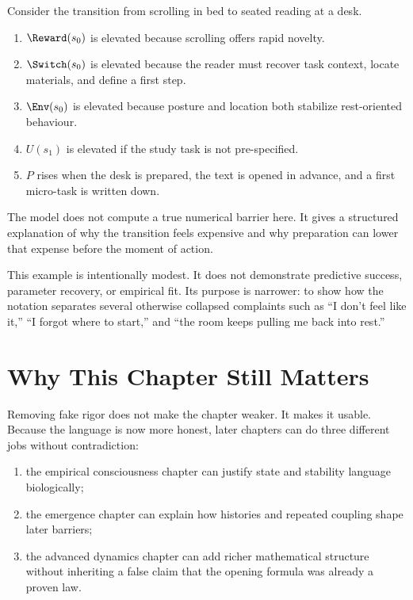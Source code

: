 \begin{example}
Consider the transition from scrolling in bed to seated reading at a desk.
\begin{enumerate}[nosep]
  \item $\Reward(s_0)$ is elevated because scrolling offers rapid novelty.
  \item $\Switch(s_0)$ is elevated because the reader must recover task
        context, locate materials, and define a first step.
  \item $\Env(s_0)$ is elevated because posture and location both stabilize
        rest-oriented behaviour.
  \item $U(s_1)$ is elevated if the study task is not pre-specified.
  \item $P$ rises when the desk is prepared, the text is opened in advance, and
        a first micro-task is written down.
\end{enumerate}
The model does not compute a true numerical barrier here. It gives a structured
explanation of why the transition feels expensive and why preparation can lower
that expense before the moment of action.
\end{example}

\begin{discussion}
This example is intentionally modest. It does not demonstrate predictive
success, parameter recovery, or empirical fit. Its purpose is narrower: to show
how the notation separates several otherwise collapsed complaints such as ``I
don't feel like it,'' ``I forgot where to start,'' and ``the room keeps pulling
me back into rest.''
\end{discussion}

\section{Why This Chapter Still Matters}

Removing fake rigor does not make the chapter weaker. It makes it usable.
Because the language is now more honest, later chapters can do three different
jobs without contradiction:
\begin{enumerate}[nosep]
  \item the empirical consciousness chapter can justify state and stability
        language biologically;
  \item the emergence chapter can explain how histories and repeated coupling
        shape later barriers;
  \item the advanced dynamics chapter can add richer mathematical structure
        without inheriting a false claim that the opening formula was already
        a proven law.
\end{enumerate}

